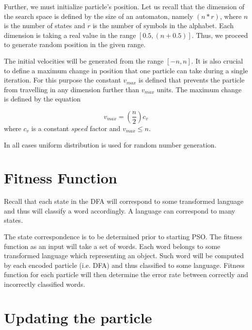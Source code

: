 \documentclass{mini}
\begin{document}
Further, we must initialize particle's position. Let us recall that the dimension of the search space is defined by the size of an automaton, namely $(n*r)$, where $n$ is the number of states and $r$ is the number of symbols in the alphabet. Each dimension is taking a real value in the range $[0.5, (n+0.5)]$. Thus, we proceed to generate random position in the given range.

The initial velocities will be generated from the range $[-n,n]$. It is also crucial to define a maximum change in position that one particle can take during a single iteration. For this purpose the constant $v_{max}$ is defined that prevents the particle from travelling in any dimension further than $v_{max}$ units. The maximum change is defined by the equation 

\begin{equation}
    v_{max} = (\frac{n}{2})c_{v}
\end{equation}
where $c_{v}$ is a constant $speed$ factor and $v_{max} \leq n$.

In all cases uniform distribution is used for random number generation.

\section{Fitness Function}\label{sec:fitness}
Recall that each state in the DFA will correspond to some transformed language and thus will classify a word accordingly. A language can correspond to many states. 

The state correspondence is to be determined prior to starting PSO. The fitness function as an input will take a set of words. Each word belongs to some transformed language which representing an object. Such word will be computed by each encoded particle (i.e. DFA) and thus classified to some language. Fitness function for each particle will then determine the error rate between correctly and incorrectly classified words.

\section{Updating the particle}


\end{document}
